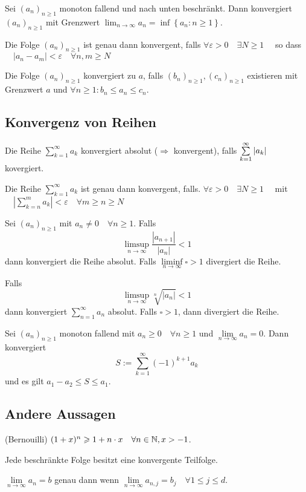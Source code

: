 \Satz[Monotone] Sei $\left(a_{n}\right)_{n \geqslant 1}$ monoton fallend und nach unten beschränkt. Dann konvergiert
$\left(a_{n}\right)_{n \geqslant 1}$ mit Grenzwert
$
\lim _{n \rightarrow \infty} a_{n}=\inf \left\{a_{n}: n \geqslant 1\right\}
$.

\Satz[Cauchy] Die Folge $\left(a_{n}\right)_{n \geqslant 1}$ ist genau dann konvergent, falls $\forall \varepsilon>0 \quad \exists N \geqslant 1 \quad$ so dass $\quad\left|a_{n}-a_{m}\right|<\varepsilon \quad \forall n, m \geqslant N$

\Satz[Sandwich] Die Folge $\left(a_{n}\right)_{n \geqslant 1}$ konvergiert zu $a$, falls $\left(b_{n}\right)_{n \geqslant 1}, \left(c_{n}\right)_{n \geqslant 1}$ existieren mit Grenzwert $a$ und $\forall n\geq1 : b_n \leq a_n \leq c_n$.


\subsection{Konvergenz von Reihen}

\Def Die Reihe $\sum_{k=1}^{\infty} a_{k}$ konvergiert absolut ($\Rightarrow$ konvergent), falls $\sum\limits_{k=1}^{\infty} \left\lvert a_{k} \right\rvert$ kovergiert.

\Satz[Cauchy] Die Reihe $\sum_{k=1}^{\infty} a_{k}$ ist genau dann konvergent, falls. $\forall \varepsilon>0 \quad \exists N \geqslant 1 \quad$ mit $\quad\left|\sum\limits_{k=n}^{m} a_{k}\right|<\varepsilon \quad \forall m \geqslant n \geqslant N$

\Satz[Ratio] Sei $\left(a_{n}\right)_{n \geqslant 1}$ mit $a_{n} \neq 0 \quad \forall n \geqslant 1 .$ Falls 
$$\limsup\limits_{n \rightarrow \infty} \frac{\left|a_{n+1}\right|}{\left|a_{n}\right|}<1$$ dann konvergiert die Reihe absolut.
Falls $\liminf\limits_{n \rightarrow \infty}\square > 1$ divergiert die Reihe.

\Satz[Root] Falls $$\limsup\limits_{n \rightarrow \infty} \sqrt[n]{\left|a_{n}\right|}<1$$ dann konvergiert $\sum_{n=1}^{\infty} a_{n}$ absolut. Falls $\square > 1$, dann divergiert die Reihe.

\Satz[Alternating] Sei $\left(a_{n}\right)_{n \geqslant 1}$ monoton fallend mit $a_{n} \geqslant 0 \quad \forall n \geqslant 1$ und $\lim \limits_{n \rightarrow \infty} a_{n}=0 .$ Dann konvergiert 
$$S:=\sum_{k=1}^{\infty}(-1)^{k+1} a_{k}$$ und es gilt $a_{1}-a_{2} \leqslant S \leqslant a_{1}$.


\subsection{Andere Aussagen}
\Lemma (Bernouilli) $(1+x)^{n} \geqslant 1+n \cdot x \quad \forall n \in \mathbb{N}, x>-1$.

\Satz[Teilfolge] Jede beschränkte Folge besitzt eine konvergente Teilfolge.

\Satz[Vektorfolge] $\lim \limits_{n \rightarrow \infty} a_{n}=b$ genau dann wenn $\lim \limits_{n \rightarrow \infty} a_{n, j}=b_{j} \quad \forall 1 \leqslant j \leqslant d$.